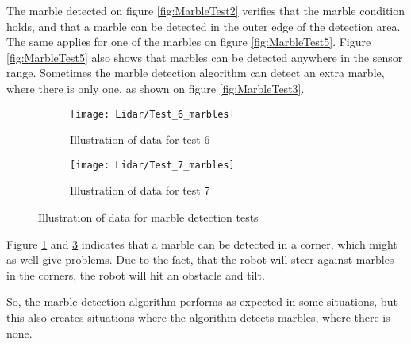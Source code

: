 \documentclass[../Head/Main.tex]{subfiles}
\begin{document}
The marble detected on figure \ref{fig:MarbleTest2} verifies that the marble condition holds, and that a marble can be detected in the outer edge of the detection area. The same applies for one of the marbles on figure \ref{fig:MarbleTest5}. Figure \ref{fig:MarbleTest5} also shows that marbles can be detected anywhere in the sensor range. Sometimes the marble detection algorithm can detect an extra marble, where there is only one, as shown on figure \ref{fig:MarbleTest3}. 
\begin{figure}[H]
  \begin{subfigure}[b]{0.5\textwidth}
  	\centering
    \texttt{[image: Lidar/Test\_6\_marbles]}
    \caption{Illustration of data for test 6}
    \label{fig:MarbleTest6}
  \end{subfigure}
  \hfill
  \begin{subfigure}[b]{0.5\textwidth}
  	\centering
    \texttt{[image: Lidar/Test\_7\_marbles]}
    \caption{Illustration of data for test 7}
    \label{fig:MarbleTest7}
  \end{subfigure}
  \caption{Illustration of data for marble detection tests}
\end{figure}
Figure \ref{fig:MarbleTest6} and \ref{fig:MarbleTest7} indicates that a marble can be detected in a corner, which might as well give problems. Due to the fact, that the robot will steer against marbles in the corners, the robot will hit an obstacle and tilt.\par
So, the marble detection algorithm performs as expected in some situations, but this also creates situations where the algorithm detects marbles, where there is none. 
\end{document}
